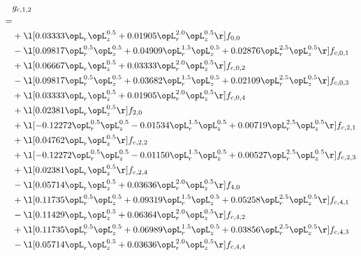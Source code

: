 \begin{alignat}{2} 
\label{eq:g_12_0} 
& g_{c,1,2} \nonumber \\ 
 = \\ 
& + \l[  0.03333 \opL_r \opL_z^{0.5} +  0.01905 \opL_r^{2.0} \opL_z^{0.5}  \r] f_{0,0} \nonumber \\ 
& - \l[  0.09817 \opL_r^{0.5} \opL_z^{0.5} +  0.04909 \opL_r^{1.5} \opL_z^{0.5} +  0.02876 \opL_r^{2.5} \opL_z^{0.5}  \r] f_{c,0,1} \nonumber \\ 
& + \l[  0.06667 \opL_r \opL_z^{0.5} +  0.03333 \opL_r^{2.0} \opL_z^{0.5}  \r] f_{c,0,2} \nonumber \\ 
& - \l[  0.09817 \opL_r^{0.5} \opL_z^{0.5} +  0.03682 \opL_r^{1.5} \opL_z^{0.5} +  0.02109 \opL_r^{2.5} \opL_z^{0.5}  \r] f_{c,0,3} \nonumber \\ 
& + \l[  0.03333 \opL_r \opL_z^{0.5} +  0.01905 \opL_r^{2.0} \opL_z^{0.5}  \r] f_{c,0,4} \nonumber \\ 
& + \l[  0.02381 \opL_r \opL_z^{0.5}  \r] f_{2,0} \nonumber \\ 
& + \l[  -0.12272 \opL_r^{0.5} \opL_z^{0.5}   -0.01534 \opL_r^{1.5} \opL_z^{0.5} +  0.00719 \opL_r^{2.5} \opL_z^{0.5}  \r] f_{c,2,1} \nonumber \\ 
& + \l[  0.04762 \opL_r \opL_z^{0.5}  \r] f_{c,2,2} \nonumber \\ 
& + \l[  -0.12272 \opL_r^{0.5} \opL_z^{0.5}   -0.01150 \opL_r^{1.5} \opL_z^{0.5} +  0.00527 \opL_r^{2.5} \opL_z^{0.5}  \r] f_{c,2,3} \nonumber \\ 
& + \l[  0.02381 \opL_r \opL_z^{0.5}  \r] f_{c,2,4} \nonumber \\ 
& - \l[  0.05714 \opL_r \opL_z^{0.5} +  0.03636 \opL_r^{2.0} \opL_z^{0.5}  \r] f_{4,0} \nonumber \\ 
& + \l[  0.11735 \opL_r^{0.5} \opL_z^{0.5} +  0.09319 \opL_r^{1.5} \opL_z^{0.5} +  0.05258 \opL_r^{2.5} \opL_z^{0.5}  \r] f_{c,4,1} \nonumber \\ 
& - \l[  0.11429 \opL_r \opL_z^{0.5} +  0.06364 \opL_r^{2.0} \opL_z^{0.5}  \r] f_{c,4,2} \nonumber \\ 
& + \l[  0.11735 \opL_r^{0.5} \opL_z^{0.5} +  0.06989 \opL_r^{1.5} \opL_z^{0.5} +  0.03856 \opL_r^{2.5} \opL_z^{0.5}  \r] f_{c,4,3} \nonumber \\ 
& - \l[  0.05714 \opL_r \opL_z^{0.5} +  0.03636 \opL_r^{2.0} \opL_z^{0.5}  \r] f_{c,4,4} \nonumber \\ 
\end{alignat} 



